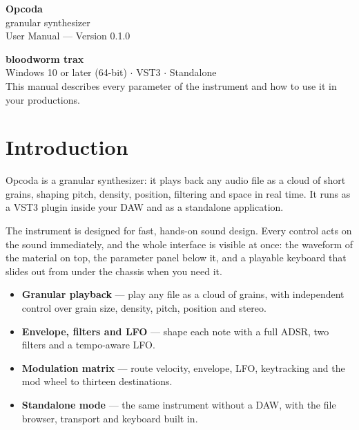 \documentclass[11pt,a4paper]{article}
\begin{document}
\hypersetup{pageanchor=false}
\begin{titlepage}
\thispagestyle{empty}
\noindent\colorbox{ink}{%
  \begin{minipage}[c][0.42\textheight][c]{\dimexpr\textwidth-2\fboxsep}
    \centering
    \color{white}
    {\sffamily\fontsize{46}{52}\selectfont\bfseries Opcoda}\\[6pt]
    {\sffamily\Large granular synthesizer}\\[2pt]
    {\sffamily\large\color{accent} User Manual --- Version 0.1.0}
  \end{minipage}}

\vfill
\noindent\begin{minipage}{\textwidth}
\color{mid}\sffamily\small
\textbf{bloodworm trax}\\[2pt]
Windows 10 or later (64-bit) $\cdot$ VST3 $\cdot$ Standalone\\[6pt]
This manual describes every parameter of the instrument and how to use it in your productions.
\end{minipage}
\end{titlepage}

\hypersetup{pageanchor=true}
\tableofcontents
\clearpage
{}

\section{Introduction}
Opcoda is a granular synthesizer: it plays back any audio file as a cloud of
short grains, shaping pitch, density, position, filtering and space in real
time. It runs as a VST3 plugin inside your DAW and as a standalone application.

The instrument is designed for fast, hands-on sound design. Every control
acts on the sound immediately, and the whole interface is visible at once:
the waveform of the material on top, the parameter panel below it, and a
playable keyboard that slides out from under the chassis when you need it.

\begin{itemize}
  \item \textbf{Granular playback} --- play any file as a cloud of grains, with
  independent control over grain size, density, pitch, position and stereo.
  \item \textbf{Envelope, filters and LFO} --- shape each note with a full ADSR,
  two filters and a tempo-aware LFO.
  \item \textbf{Modulation matrix} --- route velocity, envelope, LFO, keytracking
  and the mod wheel to thirteen destinations.
  \item \textbf{Standalone mode} --- the same instrument without a DAW, with the
  file browser, transport and keyboard built in.
\end{itemize}
\end{document}
